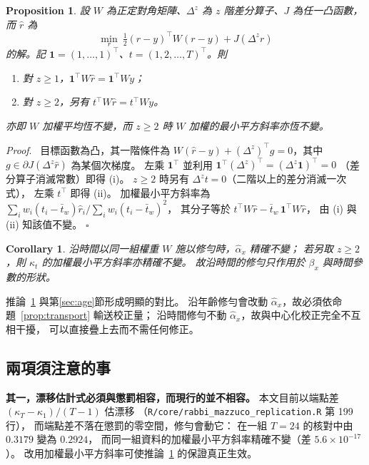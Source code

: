 \documentclass[UTF8, fontset=macnew, a4paper, 12pt]{ctexart}
\newtheorem{prop}{Proposition}
\newtheorem{cor}{Corollary}
\newenvironment{proof}{\par\noindent\textit{Proof}.\ }{\hfill$\square$\par\vspace{4pt}}
\begin{document}
\begin{prop}\label{prop:invariance}
設 $W$ 為正定對角矩陣、$\Delta^{z}$ 為 $z$ 階差分算子、$J$ 為任一凸函數，
而 $\hat r$ 為
$$\min_r\ \tfrac12 (r-y)^{\top}W(r-y) + J(\Delta^{z} r)$$
的解。記 $\mathbf 1=(1,\ldots,1)^{\top}$、$t=(1,2,\ldots,T)^{\top}$。則
\begin{enumerate}[label=(\roman*)]
\item 對 $z\ge1$，$\mathbf 1^{\top}W\hat r=\mathbf 1^{\top}W y$；
\item 對 $z\ge2$，另有 $t^{\top}W\hat r=t^{\top}W y$。
\end{enumerate}
亦即 $W$ 加權平均恆不變，而 $z\ge2$ 時 $W$ 加權的最小平方斜率亦恆不變。
\end{prop}

\begin{proof}
目標函數為凸，其一階條件為
$W(\hat r-y)+(\Delta^{z})^{\top}g=0$，其中
$g\in\partial J(\Delta^{z}\hat r)$ 為某個次梯度。
左乘 $\mathbf 1^{\top}$ 並利用 $\mathbf 1^{\top}(\Delta^{z})^{\top}=(\Delta^{z}\mathbf 1)^{\top}=0$
（差分算子消滅常數）即得 (i)。
$z\ge2$ 時另有 $\Delta^{z}t=0$（二階以上的差分消滅一次式），
左乘 $t^{\top}$ 即得 (ii)。
加權最小平方斜率為
$\sum_i w_i(t_i-\bar t_w)\hat r_i\big/\sum_i w_i(t_i-\bar t_w)^2$，
其分子等於 $t^{\top}W\hat r-\bar t_w\,\mathbf 1^{\top}W\hat r$，
由 (i) 與 (ii) 知該值不變。
\end{proof}

\begin{cor}\label{cor:alpha}
沿時間以同一組權重 $W$ 施以修勻時，$\hat\alpha_x$ 精確不變；
若另取 $z\ge2$，則 $\kappa_t$ 的加權最小平方斜率亦精確不變。
故沿時間的修勻只作用於 $\beta_x$ 與時間參數的形狀。
\end{cor}

推論~\ref{cor:alpha} 與第\ref{sec:age}節形成明顯的對比。
沿年齡修勻會改動 $\hat\alpha_x$，故必須依命題~\ref{prop:transport} 輸送校正量；
沿時間修勻不動 $\hat\alpha_x$，故與中心化校正完全不互相干擾，
可以直接疊上去而不需任何修正。

\subsection{兩項須注意的事}\label{subsec:time-caveat}

\textbf{其一，漂移估計式必須與懲罰相容，而現行的並不相容。}
本文目前以端點差 $(\kappa_T-\kappa_1)/(T-1)$ 估漂移
（\texttt{R/core/rabbi\_mazzuco\_replication.R} 第 199 行），
而端點差不落在懲罰的零空間，修勻會動它：
在一組 $T=24$ 的核對中由 $0.3179$ 變為 $0.2924$，
而同一組資料的加權最小平方斜率精確不變（差 $5.6\times10^{-17}$）。
改用加權最小平方斜率可使推論~\ref{cor:alpha} 的保證真正生效。
\end{document}
